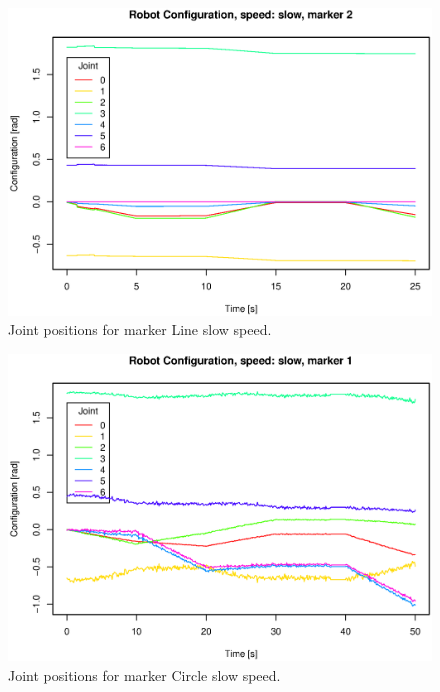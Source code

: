 \begin{figure}[H]\centering\includegraphics[width=\fullImageWidth]{graphics/rovi_robot_configuration_slow_marker2.eps}  \caption{Joint positions for marker Line   slow speed.  }     \label{fig:rovi_joint_pos_S_Line  }   \end{figure}
\begin{figure}[H]\centering\includegraphics[width=\fullImageWidth]{graphics/rovi_robot_configuration_slow_marker1.eps}  \caption{Joint positions for marker Circle slow speed.  }     \label{fig:rovi_joint_pos_S_Circle}   \end{figure}

